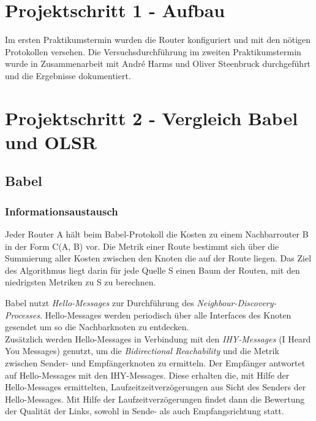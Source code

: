 \documentclass[10pt]{scrartcl}
\author{Carsten Noetzel, Armin Steudte}
\title{\titletext}
\date{09.11.2011}
\begin{document}
\maketitle

\setcounter{tocdepth}{3}
\tableofcontents
\listoffigures

\section{Projektschritt 1 - Aufbau}
Im ersten Praktikumstermin wurden die Router konfiguriert und mit den nötigen Protokollen versehen. Die Versuchsdurchführung im zweiten Praktikumstermin wurde in Zusammenarbeit mit André Harms und Oliver Steenbruck durchgeführt und die Ergebnisse dokumentiert.

\section{Projektschritt 2 - Vergleich Babel und OLSR}

\subsection{Babel}
\subsubsection{Informationsaustausch}
Jeder Router A hält beim Babel-Protokoll die Kosten zu einem Nachbarrouter B in der Form C(A, B) vor. Die Metrik einer Route bestimmt sich über die Summierung aller Kosten zwischen den Knoten die auf der Route liegen. Das Ziel des Algorithmus liegt darin für jede Quelle S einen Baum der Routen, mit den niedrigsten Metriken zu S zu berechnen.

Babel nutzt \textit{Hello-Messages} zur Durchführung des \textit{Neighbour-Discovery-Processes}.
Hello-Messages werden periodisch über alle Interfaces des Knoten gesendet um so die Nachbarknoten zu entdecken.\\
Zusätzlich werden Hello-Messages in Verbindung mit den \textit{IHY-Messages} (I Heard You Messages) genutzt, um die \textit{Bidirectional Reachability} und die Metrik zwischen Sender- und Empfängerknoten zu ermitteln.
Der Empfänger antwortet auf Hello-Messages mit den IHY-Messages. 
Diese erhalten die, mit Hilfe der Hello-Messages ermittelten, Laufzeitzeitverzögerungen aus Sicht des Senders der Hello-Messages.
Mit Hilfe der Laufzeitverzögerungen findet dann die Bewertung der Qualität der Links, sowohl in Sende- als auch Empfangsrichtung statt.
\end{document}
